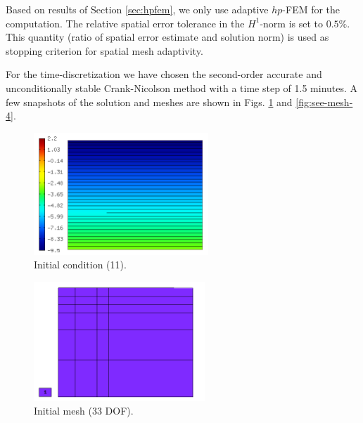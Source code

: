 \documentclass[final,3p,times,twocolumn]{elsarticle}
\begin{document}
Based on results of Section \ref{sec:hpfem}, we only use adaptive $hp$-FEM
for the computation. The relative spatial error tolerance in the $H^1$-norm
is set to $0.5 \%$. This quantity (ratio of spatial error estimate and 
solution norm) is used as stopping criterion for spatial mesh adaptivity.

For the time-discretization we have chosen the second-order accurate 
and unconditionally stable Crank-Nicolson method with a 
time step of 1.5 minutes. A few snapshots of the solution and meshes 
are shown in Figs. \ref{fig:see-sol-0} and \ref{fig:see-mesh-4}.

\begin{figure}[!ht]
\begin{center}
\vspace{-1mm}
\hspace{-0mm}
\includegraphics[height=4.6cm]{see_sol_0.png}
\end{center}
\vspace{-6mm}
\caption{Initial condition (11).}
\label{fig:see-sol-0}
\end{figure}

\begin{figure}[!ht]
\begin{center}
\vspace{-2mm}
\hspace{6mm}
\includegraphics[height=4.5cm]{see_mesh_0.png}
\end{center}
\vspace{-6mm}
\caption{Initial mesh (33 DOF).}
\label{fig:see-mesh-0}
\end{figure}
\end{document}
